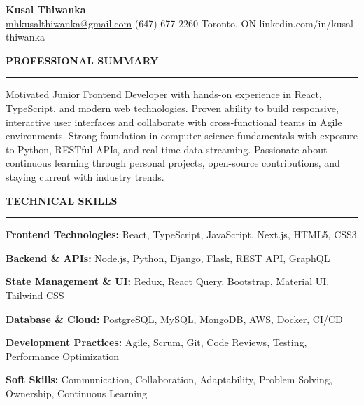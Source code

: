 \documentclass[10pt,letterpaper]{article}
\begin{document}
\begin{center}
{\LARGE\textbf{Kusal Thiwanka}}\\[3pt]
\href{mailto:mhkusalthiwanka@gmail.com}{mhkusalthiwanka@gmail.com}\hspace{2em}%
(647) 677{-}2260\hspace{2em}%
Toronto, ON\hspace{2em}
linkedin.com/in/kusal-thiwanka
\end{center}

\vspace{6pt}

\textbf{PROFESSIONAL SUMMARY}\\[-8pt]
\noindent\rule{\textwidth}{1pt}

\vspace{-2pt}

Motivated Junior Frontend Developer with hands-on experience in React, TypeScript, and modern web technologies. Proven ability to build responsive, interactive user interfaces and collaborate with cross-functional teams in Agile environments. Strong foundation in computer science fundamentals with exposure to Python, RESTful APIs, and real-time data streaming. Passionate about continuous learning through personal projects, open-source contributions, and staying current with industry trends.

\vspace{8pt}

\textbf{TECHNICAL SKILLS}\\[-8pt]
\noindent\rule{\textwidth}{1pt}

\vspace{-2pt}

\textbf{Frontend Technologies:} React, TypeScript, JavaScript, Next.js, HTML5, CSS3

\textbf{Backend \& APIs:} Node.js, Python, Django, Flask, REST API, GraphQL

\textbf{State Management \& UI:} Redux, React Query, Bootstrap, Material UI, Tailwind CSS

\textbf{Database \& Cloud:} PostgreSQL, MySQL, MongoDB, AWS, Docker, CI/CD

\textbf{Development Practices:} Agile, Scrum, Git, Code Reviews, Testing, Performance Optimization

\textbf{Soft Skills:} Communication, Collaboration, Adaptability, Problem Solving, Ownership, Continuous Learning

\vspace{8pt}
\end{document}
